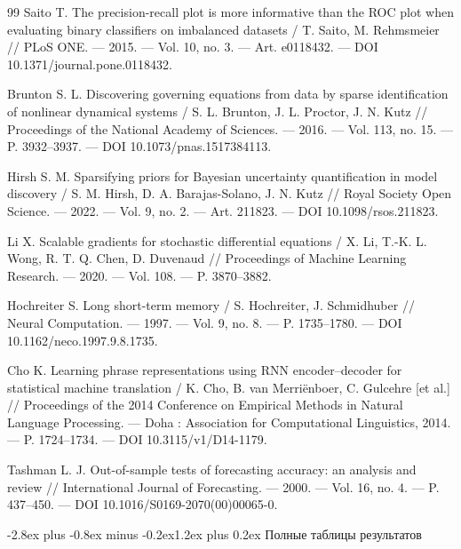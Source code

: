 \documentclass[12pt,a4paper]{article}
\makeatletter
\numberwithin{table}{section}
\numberwithin{figure}{section}
\renewcommand\section{\@startsection{section}{1}{0pt}
  {-2.8ex plus -0.8ex minus -0.2ex}{1.2ex plus 0.2ex}
  {\centering\normalfont\normalsize\bfseries}}
\makeatother
\begin{document}
\begin{thebibliography}{99}
Saito T. The precision-recall plot is more informative than the ROC plot when
evaluating binary classifiers on imbalanced datasets / T. Saito,
M. Rehmsmeier // PLoS ONE. --- 2015. --- Vol. 10, no. 3. --- Art. e0118432. ---
DOI 10.1371/journal.pone.0118432.

Brunton S. L. Discovering governing equations from data by sparse
identification of nonlinear dynamical systems / S. L. Brunton, J. L. Proctor,
J. N. Kutz // Proceedings of the National Academy of Sciences. --- 2016. ---
Vol. 113, no. 15. --- P. 3932--3937. --- DOI 10.1073/pnas.1517384113.

Hirsh S. M. Sparsifying priors for Bayesian uncertainty quantification in model
discovery / S. M. Hirsh, D. A. Barajas-Solano, J. N. Kutz // Royal Society Open
Science. --- 2022. --- Vol. 9, no. 2. --- Art. 211823. --- DOI
10.1098/rsos.211823.

Li X. Scalable gradients for stochastic differential equations / X. Li,
T.-K. L. Wong, R. T. Q. Chen, D. Duvenaud // Proceedings of Machine Learning
Research. --- 2020. --- Vol. 108. --- P. 3870--3882.

Hochreiter S. Long short-term memory / S. Hochreiter, J. Schmidhuber // Neural
Computation. --- 1997. --- Vol. 9, no. 8. --- P. 1735--1780. --- DOI
10.1162/neco.1997.9.8.1735.

Cho K. Learning phrase representations using RNN encoder--decoder for
statistical machine translation / K. Cho, B. van Merriënboer, C. Gulcehre
[et al.] // Proceedings of the 2014 Conference on Empirical Methods in Natural
Language Processing. --- Doha : Association for Computational Linguistics,
2014. --- P. 1724--1734. --- DOI 10.3115/v1/D14-1179.

Tashman L. J. Out-of-sample tests of forecasting accuracy: an analysis and
review // International Journal of Forecasting. --- 2000. --- Vol. 16, no. 4.
--- P. 437--450. --- DOI 10.1016/S0169-2070(00)00065-0.

\end{thebibliography}

\clearpage
\appendix
\makeatletter
{}
\makeatother
\renewcommand{\thetable}{\Alph{section}.\arabic{table}}
\section{Полные таблицы результатов}
\end{document}
